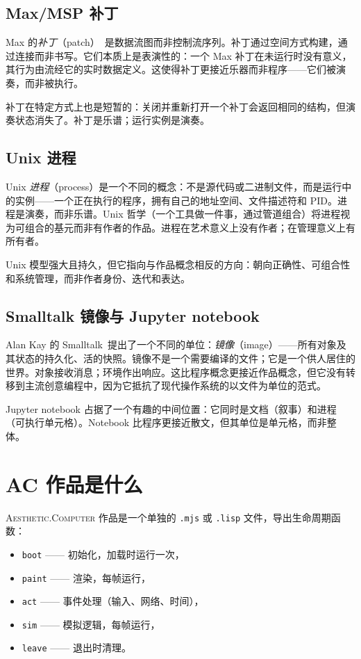 \documentclass[10pt,letterpaper,twocolumn]{article}
\newcommand{\ac}{\textsc{Aesthetic.Computer}}
\begin{document}
\subsection{Max/MSP 补丁}

Max 的\emph{补丁}（patch）~\citep{puckette1988patcher,puckette1996pure}是数据流图而非控制流序列。补丁通过空间方式构建，通过连接而非书写。它们本质上是表演性的：一个 Max 补丁在未运行时没有意义，其行为由流经它的实时数据定义。这使得补丁更接近乐器而非程序——它们被演奏，而非被执行。

补丁在特定方式上也是短暂的：关闭并重新打开一个补丁会返回相同的结构，但演奏状态消失了。补丁是乐谱；运行实例是演奏。

\subsection{Unix 进程}

Unix \emph{进程}（process）是一个不同的概念：不是源代码或二进制文件，而是运行中的实例——一个正在执行的程序，拥有自己的地址空间、文件描述符和 PID。进程是演奏，而非乐谱。Unix 哲学（一个工具做一件事，通过管道组合）将进程视为可组合的基元而非有作者的作品。进程在艺术意义上没有作者；在管理意义上有所有者。

Unix 模型强大且持久，但它指向与作品概念相反的方向：朝向正确性、可组合性和系统管理，而非作者身份、迭代和表达。

\subsection{Smalltalk 镜像与 Jupyter notebook}

Alan Kay 的 Smalltalk~\citep{kay1977personal}提出了一个不同的单位：\emph{镜像}（image）——所有对象及其状态的持久化、活的快照。镜像不是一个需要编译的文件；它是一个供人居住的世界。对象接收消息；环境作出响应。这比程序概念更接近作品概念，但它没有转移到主流创意编程中，因为它抵抗了现代操作系统的以文件为单位的范式。

Jupyter notebook 占据了一个有趣的中间位置：它同时是文档（叙事）和进程（可执行单元格）。Notebook 比程序更接近散文，但其单位是单元格，而非整体。

\section{AC 作品是什么}

\ac{} 作品是一个单独的 \texttt{.mjs} 或 \texttt{.lisp} 文件，导出生命周期函数：

\begin{itemize}
  \item \texttt{boot} —— 初始化，加载时运行一次，
  \item \texttt{paint} —— 渲染，每帧运行，
  \item \texttt{act} —— 事件处理（输入、网络、时间），
  \item \texttt{sim} —— 模拟逻辑，每帧运行，
  \item \texttt{leave} —— 退出时清理。
\end{itemize}
\end{document}
